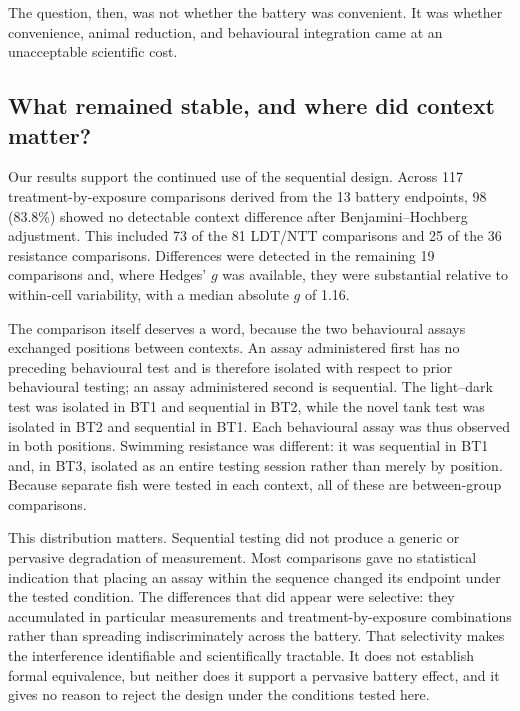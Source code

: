 \documentclass[12pt,a4paper]{article}
\begin{document}
The question, then, was not whether the battery was convenient. It was whether convenience, animal reduction, and behavioural integration came at an unacceptable scientific cost.

\subsection{What remained stable, and where did context matter?}

Our results support the continued use of the sequential design. Across 117 treatment-by-exposure comparisons derived from the 13 battery endpoints, 98 (83.8\%) showed no detectable context difference after Benjamini--Hochberg adjustment. This included 73 of the 81 LDT/NTT comparisons and 25 of the 36 resistance comparisons. Differences were detected in the remaining 19 comparisons and, where Hedges' $g$ was available, they were substantial relative to within-cell variability, with a median absolute $g$ of 1.16.

The comparison itself deserves a word, because the two behavioural assays exchanged positions between contexts. An assay administered first has no preceding behavioural test and is therefore isolated with respect to prior behavioural testing; an assay administered second is sequential. The light--dark test was isolated in BT1 and sequential in BT2, while the novel tank test was isolated in BT2 and sequential in BT1. Each behavioural assay was thus observed in both positions. Swimming resistance was different: it was sequential in BT1 and, in BT3, isolated as an entire testing session rather than merely by position. Because separate fish were tested in each context, all of these are between-group comparisons.

This distribution matters. Sequential testing did not produce a generic or pervasive degradation of measurement. Most comparisons gave no statistical indication that placing an assay within the sequence changed its endpoint under the tested condition. The differences that did appear were selective: they accumulated in particular measurements and treatment-by-exposure combinations rather than spreading indiscriminately across the battery. That selectivity makes the interference identifiable and scientifically tractable. It does not establish formal equivalence, but neither does it support a pervasive battery effect, and it gives no reason to reject the design under the conditions tested here.
\end{document}
